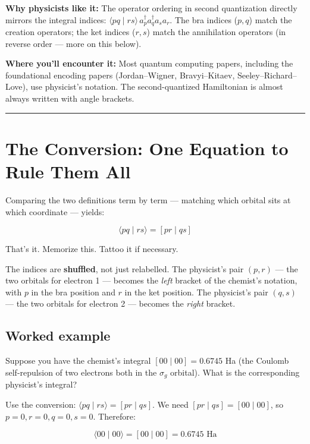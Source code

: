 \documentclass[
  11pt,
  oneside]{book}
\begin{document}
\textbf{Why physicists like it:} The operator ordering in second
quantization directly mirrors the integral indices:
\(\langle pq \mid rs\rangle \, a_p^\dagger a_q^\dagger a_s a_r\). The
bra indices (\(p, q\)) match the creation operators; the ket indices
(\(r, s\)) match the annihilation operators (in reverse order --- more
on this below).

\textbf{Where you'll encounter it:} Most quantum computing papers,
including the foundational encoding papers (Jordan--Wigner,
Bravyi--Kitaev, Seeley--Richard--Love), use physicist's notation. The
second-quantized Hamiltonian is almost always written with angle
brackets.

\begin{center}\rule{0.5\linewidth}{0.5pt}\end{center}

\section{The Conversion: One Equation to Rule Them
All}\label{the-conversion-one-equation-to-rule-them-all}

Comparing the two definitions term by term --- matching which orbital
sits at which coordinate --- yields:

\[\boxed{\langle pq \mid rs\rangle = [pr \mid qs]}\]

That's it. Memorize this. Tattoo it if necessary.

The indices are \textbf{shuffled}, not just relabelled. The physicist's
pair \((p, r)\) --- the two orbitals for electron 1 --- becomes the
\emph{left} bracket of the chemist's notation, with \(p\) in the bra
position and \(r\) in the ket position. The physicist's pair \((q, s)\)
--- the two orbitals for electron 2 --- becomes the \emph{right}
bracket.

\subsection{Worked example}\label{worked-example}

Suppose you have the chemist's integral \([00 \mid 00] = 0.6745\) Ha
(the Coulomb self-repulsion of two electrons both in the \(\sigma_g\)
orbital). What is the corresponding physicist's integral?

Use the conversion: \(\langle pq \mid rs\rangle = [pr \mid qs]\). We
need \([pr \mid qs] = [00 \mid 00]\), so \(p = 0, r = 0, q = 0, s = 0\).
Therefore:

\[\langle 00 \mid 00\rangle = [00 \mid 00] = 0.6745 \text{ Ha}\]
\end{document}
